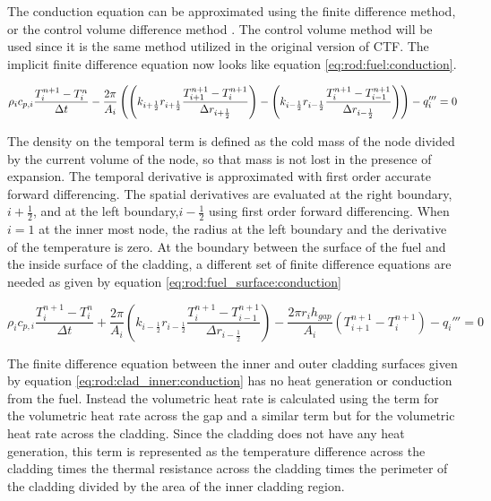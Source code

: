 The conduction equation can be approximated using the finite difference method,
or the control volume difference method \cite{Botte2000}. The control volume
method will be used  since it is the same method utilized in the original
version of CTF. The implicit  finite difference equation now looks like equation
\ref{eq:rod:fuel:conduction}.

\begin{equation}
	\small
	\label{eq:rod:fuel:conduction}
	  \rho_{i}c_{p,i}\frac{T^{n+1}_{i}-T^{n}_{i}}{\Delta t}
	- \frac{2\pi}{A_{i}}\left( 
		\left(k_{i+\frac{1}{2}}r_{i+\frac{1}{2}}
		\frac{T^{n+1}_{i+1}-T^{n+1}_{i}}{\Delta r_{i+\frac{1}{2}}}\right)
 	  - \left(k_{i-\frac{1}{2}}r_{i-\frac{1}{2}}
		\frac{T^{n+1}_{i}-T^{n+1}_{i-1}}{\Delta r_{i-\frac{1}{2}}}\right)
	  \right)
	- q_{i}'''
	= 0
\end{equation}

The density on the temporal term is defined as the cold mass of the node divided
by the current volume of the node, so that mass is not lost in the presence of
expansion. The temporal derivative is approximated with first order accurate
forward differencing. The spatial derivatives are evaluated at the right
boundary, $i+\frac{1}{2}$, and at the left boundary,$i-\frac{1}{2}$ using first
order forward differencing. When $i=1$ at the inner most node, the radius at the
left boundary and the derivative of the temperature is zero. At the boundary
between the surface of the fuel and the inside surface of the cladding, a
different set of finite difference equations are needed as given by equation
\ref{eq:rod:fuel_surface:conduction}

\begin{equation}
	\label{eq:rod:fuel_surface:conduction}
	  \rho_{i}c_{p,i}\frac{T^{n+1}_{i}-T^{n}_{i}}{\Delta t}
	+ \frac{2\pi}{A_{i}}
 	    \left(k_{i-\frac{1}{2}}r_{i-\frac{1}{2}}
		\frac{T^{n+1}_{i}-T^{n+1}_{i-1}}{\Delta r_{i-\frac{1}{2}}}\right)
	- \frac{2\pi r_{i}h_{gap}}{A_{i}}\left(T^{n+1}_{i+1}-T^{n+1}_{i}\right)
	- q_{i}'''
	= 0
\end{equation}

The finite difference equation between the inner and outer cladding surfaces
given by equation \ref{eq:rod:clad_inner:conduction} has no heat generation or
conduction from the fuel. Instead the  volumetric heat rate is calculated using
the term for the volumetric heat rate  across the gap and a similar term but for
the volumetric heat rate across the cladding. Since the cladding does not have
any heat generation, this  term is represented as the temperature difference
across the cladding times the thermal resistance across the cladding  times the
perimeter of the cladding divided by the area of the inner cladding region.

